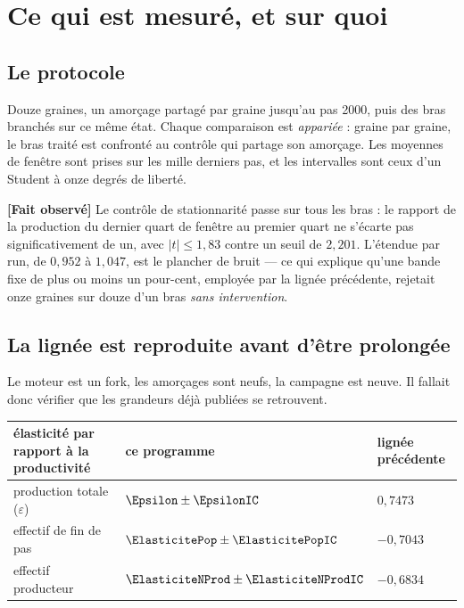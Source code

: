 \documentclass[11pt,a4paper]{article}
\newcommand{\fait}{\textbf{[Fait observé]}}
\begin{document}
\tableofcontents

\section{Ce qui est mesuré, et sur quoi}

\subsection{Le protocole}

Douze graines, un amorçage partagé par graine jusqu'au pas 2000, puis des
bras branchés sur ce même état. Chaque comparaison est \emph{appariée} :
graine par graine, le bras traité est confronté au contrôle qui partage son
amorçage. Les moyennes de fenêtre sont prises sur les mille derniers pas, et
les intervalles sont ceux d'un Student à onze degrés de liberté.

\fait{} Le contrôle de stationnarité passe sur tous les bras : le rapport de
la production du dernier quart de fenêtre au premier quart ne s'écarte pas
significativement de un, avec $|t| \le 1{,}83$ contre un seuil de $2{,}201$.
L'étendue par run, de $0{,}952$ à $1{,}047$, est le plancher de bruit --- ce
qui explique qu'une bande fixe de plus ou moins un pour-cent, employée par la
lignée précédente, rejetait onze graines sur douze d'un bras \emph{sans
intervention}.

\subsection{La lignée est reproduite avant d'être prolongée}

Le moteur est un fork, les amorçages sont neufs, la campagne est neuve. Il
fallait donc vérifier que les grandeurs déjà publiées se retrouvent.

\begin{longtable}{@{}p{}p{}p{}@{}}
\toprule
\textbf{élasticité par rapport à la productivité} & \textbf{ce programme} &
\textbf{lignée précédente} \\
\midrule
\endhead
production totale ($\varepsilon$) & $\Epsilon \pm \EpsilonIC$ & $0{,}7473$ \\
effectif de fin de pas & $\ElasticitePop \pm \ElasticitePopIC$ & $-0{,}7043$ \\
effectif producteur & $\ElasticiteNProd \pm \ElasticiteNProdIC$ & $-0{,}6834$ \\
\bottomrule
\end{longtable}
\end{document}
